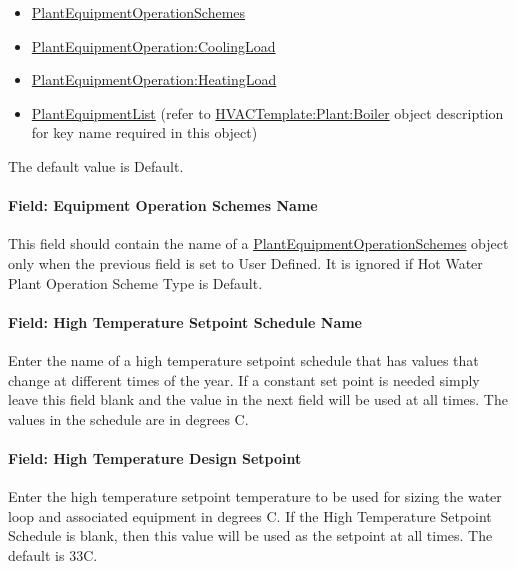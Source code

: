 \begin{itemize}
\item
  \hyperref[plantequipmentoperationschemes]{PlantEquipmentOperationSchemes}
\item
  \hyperref[plantequipmentoperationcoolingload]{PlantEquipmentOperation:CoolingLoad}
\item
  \hyperref[plantequipmentoperationheatingload]{PlantEquipmentOperation:HeatingLoad}
\item
  \hyperref[plantequipmentlist]{PlantEquipmentList} (refer to \hyperref[hvactemplateplantboiler]{HVACTemplate:Plant:Boiler} object description for key name required in this object)
\end{itemize}

The default value is Default.

\paragraph{Field: Equipment Operation Schemes Name}\label{field-equipment-operation-schemes-name}

This field should contain the name of a \hyperref[plantequipmentoperationschemes]{PlantEquipmentOperationSchemes} object only when the previous field is set to User Defined. It is ignored if Hot Water Plant Operation Scheme Type is Default.

\paragraph{Field: High Temperature Setpoint Schedule Name}\label{field-high-temperature-setpoint-schedule-name}

Enter the name of a high temperature setpoint schedule that has values that change at different times of the year. If a constant set point is needed simply leave this field blank and the value in the next field will be used at all times. The values in the schedule are in degrees C.

\paragraph{Field: High Temperature Design Setpoint}\label{field-high-temperature-design-setpoint}

Enter the high temperature setpoint temperature to be used for sizing the water loop and associated equipment in degrees C. If the High Temperature Setpoint Schedule is blank, then this value will be used as the setpoint at all times. The default is 33C.

